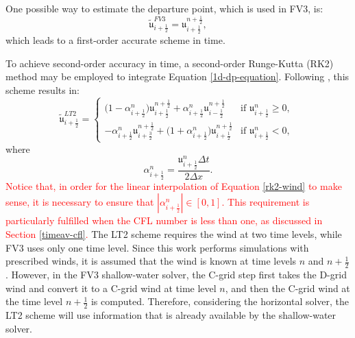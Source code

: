 \documentclass[preprint,12pt]{elsarticle}
\begin{document}
\begin{linenumbers}
One possible way to estimate the departure point, which is used in FV3, is:
\begin{equation}
	\label{dp-fv3}
	\tilde{\mathfrak{u}}^{FV3}_{i+\frac{1}{2}} = \mathfrak{u}^{n+\frac{1}{2}}_{i+\frac{1}{2}},
\end{equation}
which leads to a first-order accurate scheme in time.

To achieve second-order accuracy in time, a second-order Runge-Kutta (RK2) method may be employed to integrate Equation \eqref{1d-dp-equation}. Following \cite{durran:2010}, this scheme results in:
\begin{equation}
	\label{rk2-wind}
	\tilde{\mathfrak{u}}^{LT2}_{i+\frac{1}{2}} =
	\begin{cases}
		\big(1-\alpha_{i+\frac{1}{2}}^n \big)\mathfrak{\mathfrak{u}}^{n+\frac{1}{2}}_{i+\frac{1}{2}} +
		\alpha_{i+\frac{1}{2}}^n \mathfrak{u}^{n+\frac{1}{2}}_{i-\frac{1}{2}} & \text{if } {\mathfrak{u}}^n_{i+\frac{1}{2}}\geq 0,\\
		-\alpha_{i+\frac{1}{2}}^n \mathfrak{u}^{n+\frac{1}{2}}_{i+\frac{3}{2}} + \big(1+\alpha_{i+\frac{1}{2}}^n\big)
		\mathfrak{u}^{n+\frac{1}{2}}_{i+\frac{1}{2}} & \text{if } {\mathfrak{u}}^n_{i+\frac{1}{2}} < 0,\
	\end{cases}
\end{equation}
where $$\alpha_{i+\frac{1}{2}}^n =  \frac{\mathfrak{u}_{i+\frac{1}{2}}^n\Delta t}{2\Delta x}.$$
\textcolor{red}{
Notice that, in order for the linear interpolation of Equation \eqref{rk2-wind} to make sense, it is necessary to ensure that $|\alpha_{i+\frac{1}{2}}^n| \in [0,1]$. 
This requirement is particularly fulfilled when the CFL number is less than one, as discussed in Section \ref{timeav-cfl}.}
The LT2 scheme requires the wind at two time levels, while FV3 uses only one time level. 
Since this work performs simulations with prescribed winds, it is  assumed that the wind is known at time levels $n$ and $n+\frac{1}{2}$.
However, in the FV3 shallow-water solver, the C-grid step first takes the D-grid wind and convert it to a C-grid wind at time level $n$, and then the  C-grid wind at the time level $n+\frac{1}{2}$ is computed.
Therefore, considering the horizontal solver, the LT2 scheme will use information that is already available by the shallow-water solver.


\end{linenumbers}
\end{document}
